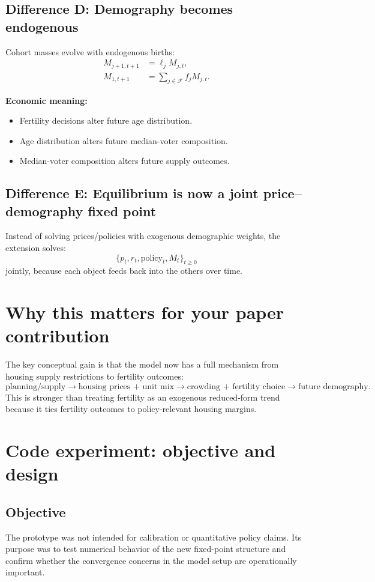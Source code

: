\documentclass[11pt]{article}
\begin{document}
\subsection*{Difference D: Demography becomes endogenous}
Cohort masses evolve with endogenous births:
\begin{align*}
M_{j+1,t+1} &= \ell_j M_{j,t}, \\
M_{1,t+1} &= \sum_{j\in\mathcal F} f_j M_{j,t}.
\end{align*}

\textbf{Economic meaning:}
\begin{itemize}
\item Fertility decisions alter future age distribution.
\item Age distribution alters future median-voter composition.
\item Median-voter composition alters future supply outcomes.
\end{itemize}

\subsection*{Difference E: Equilibrium is now a joint price--demography fixed point}
Instead of solving prices/policies with exogenous demographic weights, the extension solves:
\[
\{p_t,r_t,\text{policy}_t,M_t\}_{t\ge 0}
\]
jointly, because each object feeds back into the others over time.

\section{Why this matters for your paper contribution}
The key conceptual gain is that the model now has a full mechanism from housing supply restrictions to fertility outcomes:
\[
\text{planning/supply} \rightarrow \text{housing prices + unit mix} \rightarrow \text{crowding + fertility choice} \rightarrow \text{future demography}.
\]
This is stronger than treating fertility as an exogenous reduced-form trend because it ties fertility outcomes to policy-relevant housing margins.

\section{Code experiment: objective and design}
\subsection*{Objective}
The prototype was not intended for calibration or quantitative policy claims. Its purpose was to test numerical behavior of the new fixed-point structure and confirm whether the convergence concerns in the model setup are operationally important.
\end{document}
